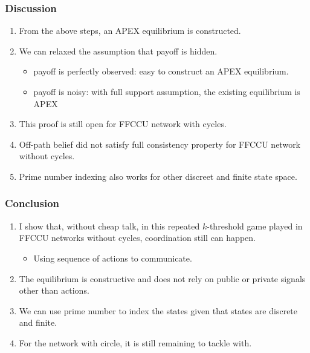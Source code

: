 \documentclass[10pt]{beamer}
\begin{document}




\begin{frame}
\frametitle{Discussion}

\begin{enumerate}


\item From the above steps, an APEX equilibrium is constructed.
\item We can relaxed the assumption that payoff is hidden.
\begin{itemize}
\item payoff is perfectly observed: easy to construct an APEX equilibrium.
\item payoff is noisy: with full support assumption, the existing equilibrium is APEX
\end{itemize}
\item This proof is still open for FFCCU network with cycles.
\item Off-path belief did not satisfy full consistency property for FFCCU network without cycles.

\item Prime number indexing also works for other discreet and finite state space.


\end{enumerate}


\end{frame}




\begin{frame}

\frametitle{Conclusion}


\begin{enumerate}
\item I show that, without cheap talk, in this repeated $k$-threshold game played in FFCCU networks without cycles, coordination still can happen.
\begin{itemize}
\item Using sequence of actions to communicate.
\end{itemize}
\item The equilibrium is constructive and does not rely on public or private signals other than actions.
\item We can use prime number to index the states given that states are discrete and finite.
\item For the network with circle, it is still remaining to tackle with.
\end{enumerate}
\end{frame}
\end{document}
